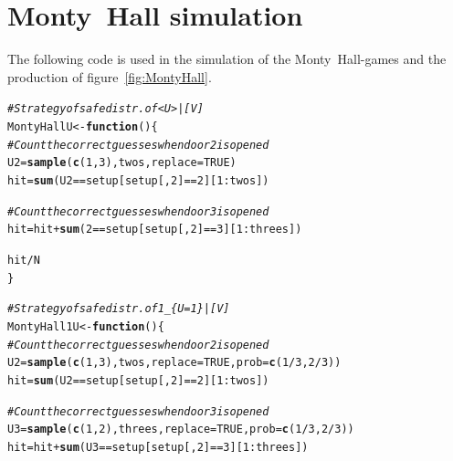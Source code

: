 \documentclass[twoside,a4paper]{article}
\makeatletter
\theoremstyle{plain}
\theoremstyle{definition}
\theoremstyle{remark}
\numberwithin{equation}{section}
\newcommand{\hlnum}[1]{\textcolor[rgb]{0.686,0.059,0.569}{#1}}%
\newcommand{\hlcom}[1]{\textcolor[rgb]{0.678,0.584,0.686}{\textit{#1}}}%
\newcommand{\hlopt}[1]{\textcolor[rgb]{0,0,0}{#1}}%
\newcommand{\hlstd}[1]{\textcolor[rgb]{0.345,0.345,0.345}{#1}}%
\newcommand{\hlkwa}[1]{\textcolor[rgb]{0.161,0.373,0.58}{\textbf{#1}}}%
\newcommand{\hlkwb}[1]{\textcolor[rgb]{0.69,0.353,0.396}{#1}}%
\newcommand{\hlkwc}[1]{\textcolor[rgb]{0.333,0.667,0.333}{#1}}%
\newcommand{\hlkwd}[1]{\textcolor[rgb]{0.737,0.353,0.396}{\textbf{#1}}}%
\newenvironment{kframe}{%
 \def\at@end@of@kframe{}%
 \ifinner\ifhmode%
  \def\at@end@of@kframe{\end{minipage}}%
  \begin{minipage}{\columnwidth}%
 \fi\fi%
 \def\FrameCommand##1{\hskip\@totalleftmargin \hskip-\fboxsep
 \colorbox{shadecolor}{##1}\hskip-\fboxsep
     \hskip-\linewidth \hskip-\@totalleftmargin \hskip\columnwidth}%
 \MakeFramed {\advance\hsize-\width
   \@totalleftmargin\z@ \linewidth\hsize
   \@setminipage}}%
 {\par\unskip\endMakeFramed%
 \at@end@of@kframe}
\newenvironment{knitrout}{}{} %
\DeclareMathOperator{\1}{\mathbbm{1}}
\makeatother
\begin{document}



\newpage
\appendix
\section{Monty~Hall simulation}\label{app:MontyHallSim}
The following code is used in the simulation of the Monty~Hall-games and the production of figure~\ref{fig:MontyHall}.
\begin{knitrout}
\color{fgcolor}\begin{kframe}
\begin{alltt}
\hlcom{# Strategy of safe distr. of <U>|[V]}
\hlstd{MontyHallU} \hlkwb{<-} \hlkwa{function} \hlstd{() \{}
  \hlcom{# Count the correct guesses when door 2 is opened}
  \hlstd{U2} \hlkwb{=} \hlkwd{sample}\hlstd{(}\hlkwd{c}\hlstd{(}\hlnum{1}\hlstd{,}\hlnum{3}\hlstd{), twos,} \hlkwc{replace} \hlstd{=} \hlnum{TRUE}\hlstd{)}
  \hlstd{hit} \hlkwb{=} \hlkwd{sum}\hlstd{(U2} \hlopt{==} \hlstd{setup[setup[,}\hlnum{2}\hlstd{]} \hlopt{==} \hlnum{2}\hlstd{][}\hlnum{1}\hlopt{:}\hlstd{twos])}

  \hlcom{# Count the correct guesses when door 3 is opened}
  \hlstd{hit} \hlkwb{=} \hlstd{hit} \hlopt{+} \hlkwd{sum}\hlstd{(}\hlnum{2} \hlopt{==} \hlstd{setup[setup[,}\hlnum{2}\hlstd{]} \hlopt{==} \hlnum{3}\hlstd{][}\hlnum{1}\hlopt{:}\hlstd{threes])}

  \hlstd{hit}\hlopt{/}\hlstd{N}
\hlstd{\}}

\hlcom{# Strategy of safe distr. of 1_\{U=1\}|[V]}
\hlstd{MontyHall1U} \hlkwb{<-} \hlkwa{function}\hlstd{() \{}
  \hlcom{# Count the correct guesses when door 2 is opened}
  \hlstd{U2} \hlkwb{=} \hlkwd{sample}\hlstd{(}\hlkwd{c}\hlstd{(}\hlnum{1}\hlstd{,}\hlnum{3}\hlstd{), twos,} \hlkwc{replace} \hlstd{=} \hlnum{TRUE}\hlstd{,} \hlkwc{prob} \hlstd{=} \hlkwd{c}\hlstd{(}\hlnum{1}\hlopt{/}\hlnum{3}\hlstd{,}\hlnum{2}\hlopt{/}\hlnum{3}\hlstd{))}
  \hlstd{hit} \hlkwb{=} \hlkwd{sum}\hlstd{(U2} \hlopt{==} \hlstd{setup[setup[,}\hlnum{2}\hlstd{]} \hlopt{==} \hlnum{2}\hlstd{][}\hlnum{1}\hlopt{:}\hlstd{twos])}

  \hlcom{# Count the correct guesses when door 3 is opened}
  \hlstd{U3} \hlkwb{=} \hlkwd{sample}\hlstd{(}\hlkwd{c}\hlstd{(}\hlnum{1}\hlstd{,}\hlnum{2}\hlstd{), threes,} \hlkwc{replace} \hlstd{=} \hlnum{TRUE}\hlstd{,} \hlkwc{prob} \hlstd{=} \hlkwd{c}\hlstd{(}\hlnum{1}\hlopt{/}\hlnum{3}\hlstd{,}\hlnum{2}\hlopt{/}\hlnum{3}\hlstd{))}
  \hlstd{hit} \hlkwb{=} \hlstd{hit} \hlopt{+} \hlkwd{sum}\hlstd{(U3} \hlopt{==} \hlstd{setup[setup[,}\hlnum{2}\hlstd{]} \hlopt{==} \hlnum{3}\hlstd{][}\hlnum{1}\hlopt{:}\hlstd{threes])}


\end{alltt}
\end{kframe}
\end{knitrout}
\end{document}
